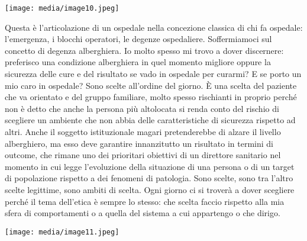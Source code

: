 \documentclass[]{article}
\begin{document}
\texttt{[image: media/image10.jpeg]}

Questa è l'articolazione di un ospedale nella concezione classica di chi
fa ospedale: l'emergenza, i blocchi operatori, le degenze ospedaliere.
Soffermiamoci sul concetto di degenza alberghiera. Io molto spesso mi
trovo a dover discernere: preferisco una condizione alberghiera in quel
momento migliore oppure la sicurezza delle cure e del risultato se vado
in ospedale per curarmi? E se porto un mio caro in ospedale? Sono scelte
all'ordine del giorno. È una scelta del paziente che va orientato e del
gruppo familiare, molto spesso rischianti in proprio perché non è detto
che anche la persona più altolocata si renda conto del rischio di
scegliere un ambiente che non abbia delle caratteristiche di sicurezza
rispetto ad altri. Anche il soggetto istituzionale magari pretenderebbe
di alzare il livello alberghiero, ma esso deve garantire innanzitutto un
risultato in termini di outcome, che rimane uno dei prioritari obiettivi
di un direttore sanitario nel momento in cui legge l'evoluzione della
situazione di una persona o di un target di popolazione rispetto a dei
fenomeni di patologia. Sono scelte, sono tra l'altro scelte legittime,
sono ambiti di scelta. Ogni giorno ci si troverà a dover scegliere
perché il tema dell'etica è sempre lo stesso: che scelta faccio rispetto
alla mia sfera di comportamenti o a quella del sistema a cui appartengo
o che dirigo.

\texttt{[image: media/image11.jpeg]}
\end{document}
